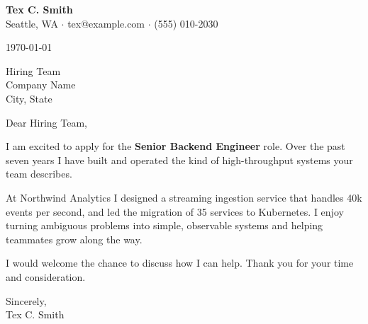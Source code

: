 \documentclass[11pt,letterpaper]{article}
\begin{document}
{\Large\bfseries Tex C. Smith}\\
Seattle, WA $\cdot$ tex@example.com $\cdot$ (555) 010-2030

\today

Hiring Team\\
Company Name\\
City, State

Dear Hiring Team,

I am excited to apply for the \textbf{Senior Backend Engineer} role. Over the past seven years I have
built and operated the kind of high-throughput systems your team describes.

At Northwind Analytics I designed a streaming ingestion service that handles 40k events per second,
and led the migration of 35 services to Kubernetes. I enjoy turning ambiguous problems into simple,
observable systems and helping teammates grow along the way.

I would welcome the chance to discuss how I can help. Thank you for your time and consideration.

Sincerely,\\[4pt]
Tex C. Smith
\end{document}
